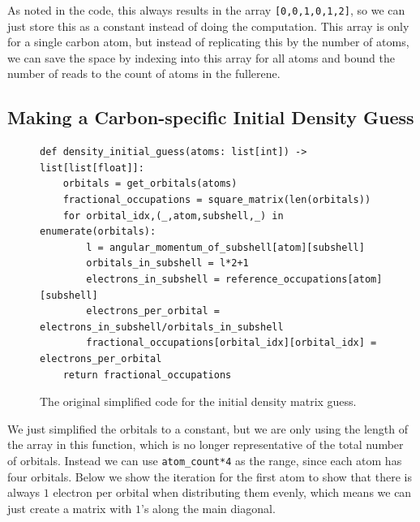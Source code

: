 As noted in the code, this always results in the array \verb|[0,0,1,0,1,2]|, so we can just store this as a constant instead of doing the computation. This array is only for a single carbon atom, but instead of replicating this by the number of atoms, we can save the space by indexing into this array for all atoms and bound the number of reads to the count of atoms in the fullerene.

\subsection{Making a Carbon-specific Initial Density Guess}

\begin{figure}[H]
\begin{verbatim}
def density_initial_guess(atoms: list[int]) -> list[list[float]]:
    orbitals = get_orbitals(atoms)
    fractional_occupations = square_matrix(len(orbitals))
    for orbital_idx,(_,atom,subshell,_) in enumerate(orbitals):
        l = angular_momentum_of_subshell[atom][subshell] 
        orbitals_in_subshell = l*2+1 
        electrons_in_subshell = reference_occupations[atom][subshell]
        electrons_per_orbital = electrons_in_subshell/orbitals_in_subshell
        fractional_occupations[orbital_idx][orbital_idx] = electrons_per_orbital
    return fractional_occupations
\end{verbatim}
\caption{The original simplified code for the initial density matrix guess.}
\end{figure}

We just simplified the orbitals to a constant, but we are only using the length of the array in this function, which is no longer representative of the total number of orbitals. Instead we can use \verb|atom_count*4| as the range, since each atom has four orbitals. Below we show the iteration for the first atom to show that there is always $1$ electron per orbital when distributing them evenly, which means we can just create a matrix with $1$'s along the main diagonal.

